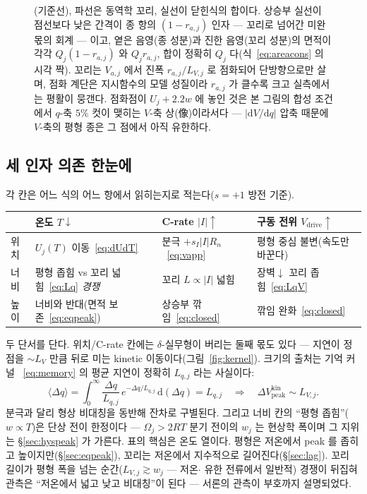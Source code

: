 \documentclass[11pt,a4paper]{article}
\newcommand{\dd}{\mathrm{d}}
\newcommand{\drive}{\mathrm{drive}}
\newcommand{\peak}{\mathrm{peak}}
\begin{document}
\begin{figure}[t]
{(기준선), 파선은 동역학 꼬리, 실선이 닫힌식의 합이다. 상승부 실선이 점선보다 낮은 간격이 종 항의
$(1-r_{a,j})$ 인자 — 꼬리로 넘어간 미완 몫의 회계 — 이고, 옅은 음영(종 성분)과 진한 음영(꼬리 성분)의
면적이 각각 $Q_j(1-r_{a,j})$ 와 $Q_j r_{a,j}$, 합이 정확히 $Q_j$ 다(식~\eqref{eq:areacons} 의 시각
짝). 꼬리는 $V_{a,j}$ 에서 진폭 $r_{a,j}/L_{V,j}$
로 점화되어 단방향으로만 살며, 점화 계단은 지시함수의 모델 성질이라 $r_{a,j}$ 가 클수록 크고 실측에서는
평활이 뭉갠다. 점화점이 $U_j+2.2w$ 에 놓인 것은 본 그림의 합성 조건에서 $q$-축 $5\%$ 컷이 맺히는 $V$-축
상(像)이라서다 — $|\dd V/\dd q|$ 압축 때문에 $V$-축의 평형 종은 그 점에서 아직 유한하다.}
\label{fig:anatomy}
\end{figure}

\subsection{세 인자 의존 한눈에}
각 칸은 어느 식의 어느 항에서 읽히는지로 적는다($s=+1$ 방전 기준).
\begin{center}
\renewcommand{\arraystretch}{1.4}
\begin{tabular}{p{} p{} p{} p{}}
\toprule
 & \textbf{온도 $T\downarrow$} & \textbf{C-rate $|I|\uparrow$} & \textbf{구동 전위 $V_\drive\uparrow$} \\
\midrule
위치 & $U_j(T)$ 이동~\eqref{eq:dUdT} & 분극 $+s_I|I|R_n$~\eqref{eq:vapp} & 평형 중심 불변(속도만 바꾼다) \\
너비 & 평형 좁힘 vs 꼬리 넓힘~\eqref{eq:Lq} \emph{경쟁} & 꼬리 $L\propto|I|$ 넓힘 & 장벽$\downarrow$ 꼬리 좁힘~\eqref{eq:LqV} \\
높이 & 너비와 반대(면적 보존~\eqref{eq:eqpeak}) & 상승부 깎임~\eqref{eq:closed} & 깎임 완화~\eqref{eq:closed} \\
\bottomrule
\end{tabular}
\end{center}
두 단서를 단다. 위치/C-rate 칸에는 $\delta$-실무형이 버리는 둘째 몫도 있다 — 지연이 정점을
$\sim L_V$ 만큼 뒤로 미는 kinetic 이동이다(그림~\ref{fig:kernel}). 크기의 출처는 기억 커널
~\eqref{eq:memory} 의 평균 지연이 정확히 $L_{q,j}$ 라는 사실이다:
\begin{equation}
\langle\Delta q\rangle
=\int_0^\infty\frac{\Delta q}{L_{q,j}}\,e^{-\Delta q/L_{q,j}}\,\dd(\Delta q)
=L_{q,j}
\quad\Rightarrow\quad
\Delta V_{\peak}^{\text{kin}}\sim L_{V,j}.
\label{eq:kinshift}
\end{equation}
분극과 달리 형상 비대칭을 동반해 잔차로 구별된다. 그리고 너비 칸의 ``평형 좁힘''($w\propto T$)은 단상 전이 한정이다 —
$\Omega_j>2RT$ 분기 전이의 $w_j$ 는 현상학 폭이며 그 지위는 \S\ref{sec:hyspeak} 가 가른다.
표의 핵심은 온도 열이다. 평형은 저온에서 peak 를 좁히고 높이지만(\S\ref{sec:eqpeak}), 꼬리는 저온에서
지수적으로 길어진다(\S\ref{sec:lag}). 꼬리 길이가 평형 폭을 넘는 순간($L_{V,j}\gtrsim w_j$ — 저온$\cdot$
유한 전류에서 일반적) 경쟁이 뒤집혀 관측은 ``저온에서 넓고 낮고 비대칭''이 된다 — 서론의 관측이 부호까지
설명되었다.
\end{document}
